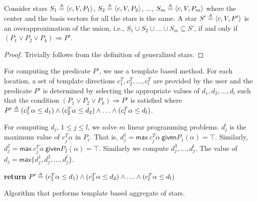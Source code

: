 \begin{lemma}
\label{lem:agg}
Consider stars $S_1 \deq \tup{c, V, P_1}$, $S_2 \deq \tup{c, V, P_2}$, $\ldots$, $S_m \deq \tup{c, V, P_m}$ where the center and the basis vectors for all the stars is the same.
%
A star $S' \deq \tup{c, V, P'}$ is an overapproximation of the union, i.e., $S_1 \cup S_2 \cup \ldots \cup S_m \subseteq S'$, if and only if $(P_1 \vee P_2 \vee P_k) \Rightarrow P'$.
\end{lemma}
\begin{proof}
Trivially follows from the definition of generalized stars.
\end{proof}

 For computing the predicate $P'$, we use a template based method.
%
%
For each location, a set of template directions $c_1^{T}, c_2^{T}, \ldots, c_{l}^{T}$ are provided by the user and the predicate $P'$ is determined by selecting the appropriate values of $d_1, d_2, \ldots, d_l$ such that the condition $(P_1 \vee P_2 \vee P_k) \Rightarrow P'$ is satisfied where $P' \mathrel{\stackrel{\scriptscriptstyle\Delta}{=}} (c_1^{T}\alpha \leq d_1) \wedge (c_2^{T}\alpha \leq d_2) \wedge \ldots \wedge (c_l^{T}\alpha \leq d_l)$. 

For computing $d_j$, $1 \leq j \leq l$, we solve $m$ linear programming problems. $d_j^i$ is the maximum value of $c_j^T \alpha$ in $P_i$. That is, $d_j^1 = \mathsf{max}~ c_j^T \alpha~ \mathsf{given} P_1(\alpha) = \top$. Similarly, $d_j^2 = \mathsf{max}~ c_j^T \alpha~ \mathsf{given} P_2(\alpha) = \top$. Similarly we compute $d_j^3, \ldots, d_j^l$. The value of $d_j = \mathsf{max} \{d_j^1, d_j^2, \ldots, d_j^l\}$.

\begin{algorithm}[h!]

{\bf return} $P' \mathrel{\stackrel{\scriptscriptstyle\Delta}{=}} (c_1^T \alpha \leq d_1) \wedge (c_2^T \alpha \leq d_2) \wedge \ldots \wedge (c_l^{T} \alpha \leq d_l)$\;
\caption{Algorithm that performs template based aggregate of stars.}
\label{alg:aggTemplate}
\end{algorithm}

